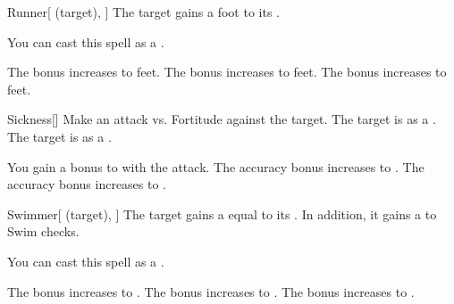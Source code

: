 \lowercase{\hypertarget{spell:Runner}{}}\label{spell:Runner}
\begin{attuneability}[Rank 1]{\hypertarget{spell:Runner}{Runner}}[ (target), ]
The target gains a  foot  to its .

You can cast this spell as a .

\rankline
{} The bonus increases to  feet.
 The bonus increases to  feet.
 The bonus increases to  feet.
\end{attuneability}
\vspace{0.25em}



\lowercase{\hypertarget{spell:Sickness}{}}\label{spell:Sickness}
\begin{freeability}[Rank 1]{\hypertarget{spell:Sickness}{Sickness}}[]
Make an attack vs. Fortitude against the target.
\hit The target is  as a .
\crit The target is  as a .

\rankline
{} You gain a  bonus to  with the attack.
 The accuracy bonus increases to .
 The accuracy bonus increases to .
\end{freeability}
\vspace{0.25em}



\lowercase{\hypertarget{spell:Swimmer}{}}\label{spell:Swimmer}
\begin{attuneability}[Rank 1]{\hypertarget{spell:Swimmer}{Swimmer}}[ (target), ]
The target gains a  equal to its .
In addition, it gains a   to Swim checks.

You can cast this spell as a .

\rankline
{} The bonus increases to .
 The bonus increases to .
 The bonus increases to .
\end{attuneability}
\vspace{0.25em}



